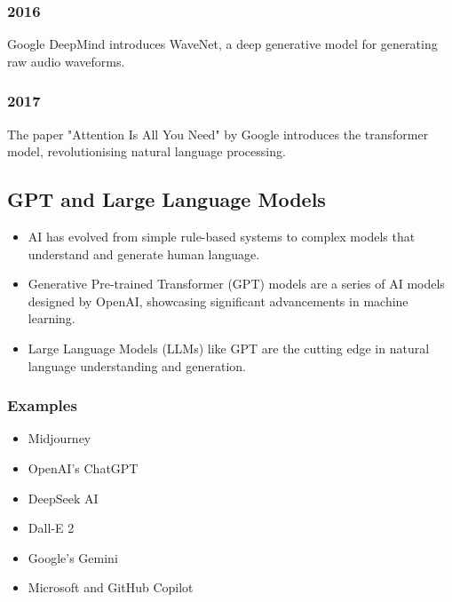 \documentclass[11pt]{article}
\begin{document}
\subsubsection{2016}
\label{sec:orgd2d3e00}
Google DeepMind introduces WaveNet, a deep generative model for generating raw audio waveforms.
\subsubsection{2017}
\label{sec:orge977868}
The paper "Attention Is All You Need" by Google introduces the transformer model, revolutionising natural language processing.
\subsection{GPT and Large Language Models}
\label{sec:org0c46ae0}
\begin{itemize}
\item AI has evolved from simple rule-based systems to complex models that understand and generate human language.
\item Generative Pre-trained Transformer (GPT) models are a series of AI models designed by OpenAI, showcasing significant advancements in machine learning.
\item Large Language Models (LLMs) like GPT are the cutting edge in natural language understanding and generation.
\end{itemize}
\subsubsection{Examples}
\label{sec:org1b53330}
\begin{itemize}
\item Midjourney
\item OpenAI's ChatGPT
\item DeepSeek AI
\item Dall-E 2
\item Google's Gemini
\item Microsoft and GitHub Copilot
\end{itemize}

 \newpage
\end{document}
